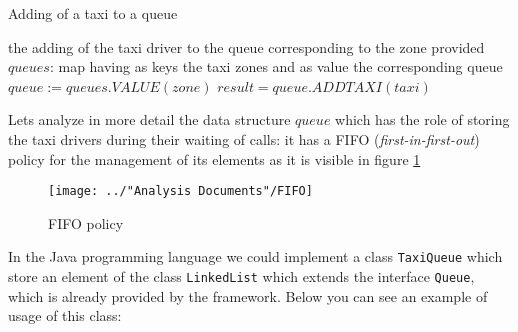\begin{algorithm}
\caption{Adding of a taxi to a queue}
\begin{algorithmic}
\ENSURE the adding of the taxi driver to the queue corresponding to the zone provided
\linebreak
\STATE $queues$: map having as keys the taxi zones and as value the corresponding queue \linebreak
$queue:= queues.VALUE(zone)$  \linebreak
$result = queue.ADDTAXI(taxi)$ 
\RETURN
\end{algorithmic}
\end{algorithm}
Lets analyze in more detail the data structure $queue$ which has the role of storing the taxi drivers during their waiting of calls: it has a FIFO (\textit{first-in-first-out}) policy for the management of its elements as it is visible in figure \ref{fig:FIFOpolicy}
\begin{figure}[H]
	\centering
	\texttt{[image: ../"Analysis Documents"/FIFO]}
	\caption{FIFO policy}
	\label{fig:FIFOpolicy}
\end{figure}
In the Java programming language we could implement a class \texttt{TaxiQueue} which store an element of the class \texttt{LinkedList} which extends the interface \texttt{Queue}, which is already provided by the framework. Below you can see an example of usage of this class:

